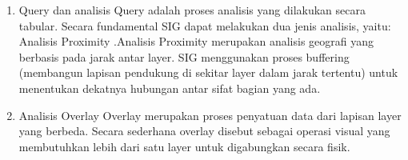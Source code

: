\begin{enumerate}
\item Query dan analisis
\subitem Query adalah proses analisis yang dilakukan secara tabular. Secara fundamental SIG dapat melakukan dua jenis analisis, yaitu:  Analisis Proximity .Analisis Proximity merupakan analisis geografi yang berbasis pada jarak antar layer. SIG menggunakan proses buffering (membangun lapisan pendukung di sekitar layer dalam jarak tertentu) untuk menentukan dekatnya hubungan antar sifat bagian yang ada.

\item Analisis Overlay
\subitem Overlay merupakan proses penyatuan data dari lapisan layer yang berbeda. Secara sederhana overlay disebut sebagai operasi visual yang membutuhkan lebih dari satu layer untuk digabungkan secara fisik.

\end{enumerate}

